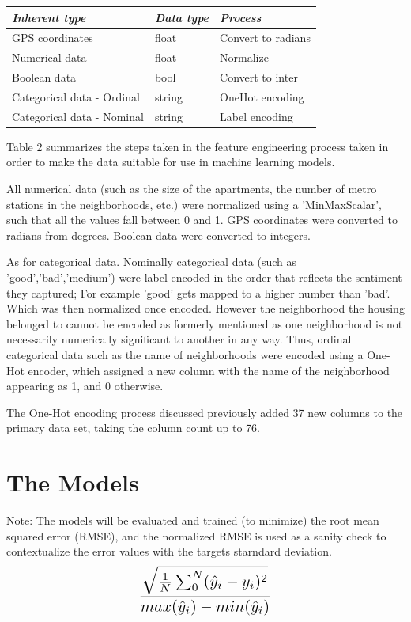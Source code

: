 \documentclass[conference]{IEEEtran}
\begin{document}
\smallbreak
\smallbreak
\smallbreak
\smallbreak
\footnotesize
\begin{tabular}{|l|l|l|}
\hline
\textit{\textbf{Inherent   type}} & \textit{\textbf{Data type}} & \textit{\textbf{Process}} \\ \hline
GPS   coordinates            & float  & Convert to radians \\ \hline
Numerical   data             & float  & Normalize          \\ \hline
Boolean data                 & bool   & Convert to inter     \\ \hline
Categorical   data - Ordinal & string & OneHot   encoding  \\ \hline
Categorical   data - Nominal & string & Label   encoding   \\ \hline
\end{tabular}
\smallbreak
{}
\smallbreak
\normalsize
Table 2 summarizes the steps taken in the feature engineering process taken in order to make the data suitable for use in machine learning models. 

All numerical data (such as the size of the apartments, the number of metro stations in the neighborhoods, etc.) were normalized using a 'MinMaxScalar', such that all the values fall between 0 and 1. GPS coordinates were converted to radians from degrees. Boolean data were converted to integers. 

As for categorical data. Nominally categorical data (such as 'good','bad','medium') were label encoded in the order that reflects the sentiment they captured; For example 'good' gets mapped to a higher number than 'bad'. Which was then normalized once encoded. However the neighborhood the housing belonged to cannot be encoded as formerly mentioned as one neighborhood is not necessarily numerically significant to another in any way. Thus, ordinal categorical data such as the name of neighborhoods were encoded using a One-Hot encoder, which assigned a new column with the name of the neighborhood appearing as 1, and 0 otherwise. 

The One-Hot encoding process discussed previously added 37 new columns to the primary data set, taking the column count up to 76.

\section{The Models}

Note: The models will be evaluated and trained (to minimize) the root mean squared error (RMSE), and the normalized RMSE is used as a sanity check to contextualize the error values with the targets starndard deviation. 
\smallbreak
\smallbreak
\[\scaleto{\frac{\sqrt{\frac{1}{N}\sum_{0}^{N}(\hat{y}_{i}-y_{i})^2}}{max({\hat{y}}_{i})-min({\hat{y}}_{i})}}{45pt}\]
\smallbreak
\smallbreak
\end{document}
